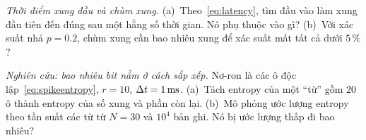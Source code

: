 \begin{exercise}[\lvlA]
\label{ex:04:6}
\emph{Thời điểm xung đầu và chùm xung.} (a)~Theo~\eqref{eq:latency}, tìm đầu vào làm xung đầu tiên đến đúng sau một hằng số thời gian. Nó phụ thuộc vào gì? (b)~Với xác suất nhả $p=0.2$, chùm xung cần bao nhiêu xung để xác suất mất tất cả dưới $5\,\%$?
\end{exercise}

\begin{exercise}[\lvlC]
\label{ex:04:7}
\emph{Nghiên cứu: bao nhiêu bit nằm ở cách sắp xếp.} Nơ-ron là các ô độc lập~\eqref{eq:spikeentropy}, $r=10$, $\Delta t=1\,\text{ms}$. (a)~Tách entropy của một ``từ'' gồm $20$ ô thành entropy của số xung và phần còn lại. (b)~Mô phỏng ước lượng entropy theo tần suất các từ từ $N=30$ và $10^4$ bản ghi. Nó bị ước lượng thấp đi bao nhiêu?
\end{exercise}
